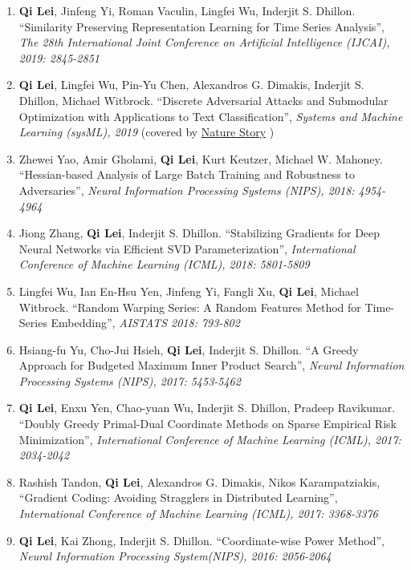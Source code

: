 \documentclass[margin, 10pt]{res} %
\begin{document}
\begin{resume}
\begin{enumerate}
  \item{ \textbf{Qi Lei}, Jinfeng Yi, Roman Vaculin, Lingfei Wu, Inderjit S. 
      Dhillon. ``Similarity Preserving Representation Learning for Time Series 
      Analysis'', \textit{The 28th International Joint Conference on Artificial 
    Intelligence (IJCAI), 2019: 2845-2851}}
  \item{\textbf{Qi Lei}, Lingfei Wu, Pin-Yu Chen, Alexandros G. Dimakis, Inderjit S. 
    Dhillon, Michael Witbrock. ``Discrete Adversarial Attacks and Submodular 
    Optimization with Applications to Text Classification'', \textit{Systems and Machine 
  Learning (sysML), 2019} (covered by \href{https://www.nature.com/articles/d41586-019-01510-1}{Nature Story} )   }
\item{Zhewei Yao, Amir Gholami, \textbf{Qi Lei}, Kurt Keutzer, Michael W. 
  Mahoney. ``Hessian-based Analysis of Large Batch Training and Robustness to 
Adversaries'', \textit{Neural Information Processing Systems (NIPS), 2018: 4954-4964}}
  \item{Jiong Zhang, \textbf{Qi Lei}, Inderjit S. Dhillon. 
        ``Stabilizing Gradients for Deep 
       Neural Networks via Efficient SVD Parameterization'', \textit{
    International Conference of Machine Learning (ICML), 2018: 5801-5809}}
  \item{Lingfei Wu, Ian En-Hsu Yen, Jinfeng Yi, Fangli Xu, \textbf{Qi Lei}, Michael Witbrock.
    ``Random Warping Series: A Random Features Method for Time-Series Embedding'', \textit{AISTATS 2018: 793-802}}

\item{Hsiang-fu Yu, Cho-Jui Hsieh, \textbf{Qi Lei}, Inderjit S. Dhillon. 
      ``A Greedy Approach for Budgeted Maximum 
      Inner Product Search'', \textit{Neural Information Processing Systems 
      (NIPS), 2017: 5453-5462}}
    \item{\textbf{Qi Lei}, Enxu Yen, Chao-yuan Wu, Inderjit S. Dhillon, Pradeep 
        Ravikumar. ``Doubly Greedy Primal-Dual Coordinate Methods on Sparse Empirical 
  Risk Minimization'', \textit{International Conference of Machine 
    Learning (ICML), 2017: 2034-2042}}
\item{Rashish Tandon, \textbf{Qi Lei}, 
    Alexandros G. Dimakis, Nikos Karampatziakis, ``Gradient Coding: Avoiding 
    Stragglers in Distributed Learning'', \textit{International Conference of 
  Machine Learning (ICML), 2017: 3368-3376}}
  \item {\textbf{Qi Lei},
      Kai Zhong, Inderjit S. Dhillon. ``Coordinate-wise Power Method'', 
  \textit{Neural Information Processing System(NIPS), 2016: 2056-2064}}		


\end{enumerate}
\end{resume}
\end{document}
